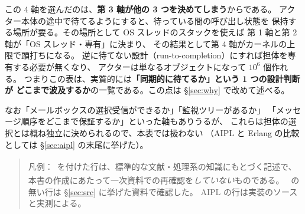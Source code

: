\documentclass[11pt,a4paper]{ltjsarticle}
\newcommand{\dg}{\textsuperscript{\dag}}
\begin{document}
この 4 軸を選んだのは、\textbf{第 3 軸が他の 3 つを決めてしまう}からである。
アクター本体の途中で待てるようにすると、待っている間の呼び出し状態を
保持する場所が要る。その場所として OS スレッドのスタックを使えば
第 1 軸と第 2 軸が「OS スレッド・専有」に決まり、
その結果として第 4 軸がカーネルの上限で頭打ちになる。
逆に待てない設計（run-to-completion）にすれば担体を専有する必要が無くなり、
アクターは単なるオブジェクトになって $10^{6}$ 個作れる。
つまりこの表は、実質的には\textbf{「同期的に待てるか」という 1 つの設計判断が
どこまで波及するか}の一覧である。この点は \S\ref{sec:why} で改めて述べる。

なお「メールボックスの選択受信ができるか」「監視ツリーがあるか」
「メッセージ順序をどこまで保証するか」といった軸もありうるが、
これらは担体の選択とは概ね独立に決められるので、本表では扱わない
（AIPL と Erlang の比較としては \S\ref{sec:aipl} の末尾に挙げた）。

\begin{quote}\small
凡例：\dg\ を付けた行は、標準的な文献・処理系の知識にもとづく記述で、
本書の作成にあたって一次資料での再確認を\emph{していない}ものである。
\dg\ の無い行は \S\ref{sec:src} に挙げた資料で確認した。
AIPL の行は実装のソースと実測による。
\end{quote}
\end{document}
